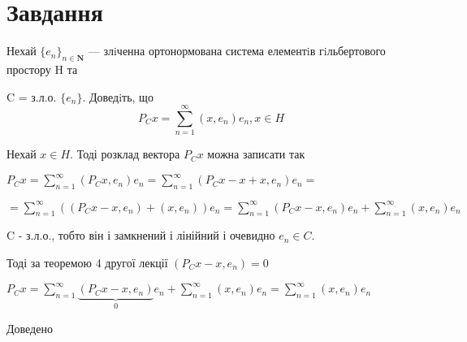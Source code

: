 
\chapter{Завдання \theHchapter}


\begin{tcolorbox}[title=Завдання]
    Нехай $\{e_n\}_{n \in \mathbf{N}} $ — злiченна ортонормована система елементiв 
    гiльбертового простору H та
    
    
    C = з.л.о. $\{e_n\}$. Доведiть, що
    $$ P_Cx = \sum_{n = 1}^{\infty}(x, e_n)e_n, x \in H $$
\end{tcolorbox}


Нехай $ x \in H $. Тоді розклад вектора $P_Cx$ можна записати так


$ P_Cx = \sum_{n = 1}^{\infty}(P_Cx, e_n)e_n = 
\sum_{n = 1}^{\infty}(P_Cx - x + x, e_n)e_n =$


$=\sum_{n = 1}^{\infty}((P_Cx - x, e_n) + (x, e_n) )e_n =
\sum_{n = 1}^{\infty}(P_Cx - x, e_n)e_n +\sum_{n = 1}^{\infty}(x, e_n)e_n$


C - з.л.о., тобто він і замкнений і лінійний і очевидно $ e_n \in C $.


Тоді за теоремою 4 другої лекції $ (P_Cx - x, e_n) = 0 $


$ P_Cx = \sum_{n = 1}^{\infty}\underbrace{(P_Cx - x, e_n)}_{\mbox{0}}e_n 
+ \sum_{n = 1}^{\infty}(x, e_n)e_n = 
\sum_{n = 1}^{\infty}(x, e_n)e_n $ 


Доведено
